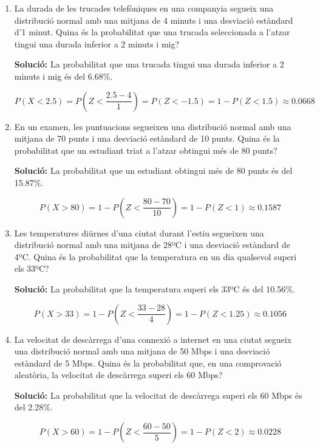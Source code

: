 \documentclass[12pt]{article}
\begin{document}
\begin{exemple} [title=]

\begin{enumerate} [start=10]

    \item La durada de les trucades telefòniques en una companyia segueix una distribució normal amb una mitjana de 4 minuts i una desviació estàndard d'1 minut. Quina és la probabilitat que una trucada seleccionada a l'atzar tingui una durada inferior a 2 minuts i mig?
    
    \textbf{Solució:} La probabilitat que una trucada tingui una durada inferior a 2 minuts i mig és del 6.68\%.
    
    \[
    P(X < 2.5) = P\left(Z< \frac{2.5 - 4}{1} \right) = P(Z< -1.5) = 1 - P(Z< 1.5) \approx 0.0668
    \]

    \item En un examen, les puntuacions segueixen una distribució normal amb una mitjana de 70 punts i una desviació estàndard de 10 punts. Quina és la probabilitat que un estudiant triat a l'atzar obtingui més de 80 punts?
    
    \textbf{Solució:} La probabilitat que un estudiant obtingui més de 80 punts és del 15.87\%.
    
    \[
    P(X > 80) = 1 - P\left(Z< \frac{80 - 70}{10} \right) = 1 - P(Z< 1) \approx 0.1587
    \]

    \item Les temperatures diürnes d'una ciutat durant l'estiu segueixen una distribució normal amb una mitjana de 28ºC i una desviació estàndard de 4ºC. Quina és la probabilitat que la temperatura en un dia qualsevol superi els 33ºC?
    
    \textbf{Solució:} La probabilitat que la temperatura superi els 33ºC és del 10.56\%.
    
    \[
    P(X > 33) = 1 - P\left(Z< \frac{33 - 28}{4} \right) = 1 - P(Z< 1.25) \approx 0.1056
    \]

    \item La velocitat de descàrrega d'una connexió a internet en una ciutat segueix una distribució normal amb una mitjana de 50 Mbps i una desviació estàndard de 5 Mbps. Quina és la probabilitat que, en una comprovació aleatòria, la velocitat de descàrrega superi els 60 Mbps?
    
    \textbf{Solució:} La probabilitat que la velocitat de descàrrega superi els 60 Mbps és del 2.28\%.
    
    \[
    P(X > 60) = 1 - P\left(Z< \frac{60 - 50}{5} \right) = 1 - P(Z< 2) \approx 0.0228
    \]


\end{enumerate}
\end{exemple}
\end{document}
